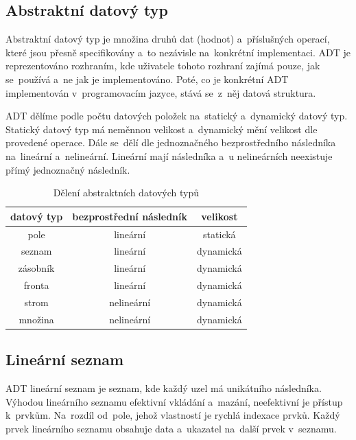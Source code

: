 \subsection{Abstraktní datový typ}

Abstraktní datový typ je množina druhů dat (hodnot) a~příslušných operací, které jsou přesně specifikovány a~to nezávisle na~konkrétní implementaci. ADT je reprezentováno rozhraním, kde uživatele tohoto rozhraní zajímá pouze, jak se~používá a~ne jak je implementováno. Poté, co je konkrétní ADT implementován v~programovacím jazyce, stává se~z~něj datová struktura.

ADT dělíme podle počtu datových položek na~statický a~dynamický datový typ. Statický datový typ má neměnnou velikost a~dynamický mění velikost dle provedené operace. Dále se~dělí dle jednoznačného bezprostředního následníka na~lineární a~nelineární. Lineární mají následníka a~u nelineárních neexistuje přímý jednoznačný následník.

\begin{table}[ht]
	\centering
	\caption{Dělení abstraktních datových typů}
	\begin{tabular}{|c||c|c|}\hline
	datový typ & bezprostřední následník & velikost  \\\hline\hline
	pole       & lineární                & statická  \\\hline
	seznam     & lineární                & dynamická \\\hline
	zásobník   & lineární                & dynamická \\\hline
	fronta     & lineární                & dynamická \\\hline
	strom      & nelineární              & dynamická \\\hline
	množina    & nelineární              & dynamická \\\hline
	\end{tabular}
\end{table}

\subsection{Lineární seznam}

ADT lineární seznam je seznam, kde každý uzel má unikátního následníka. Výhodou lineárního seznamu efektivní vkládání a~mazání, neefektivní je přístup k~prvkům. Na~rozdíl od~pole, jehož vlastností je rychlá indexace prvků. Každý prvek lineárního seznamu obsahuje data a~ukazatel na~další prvek v~seznamu.

